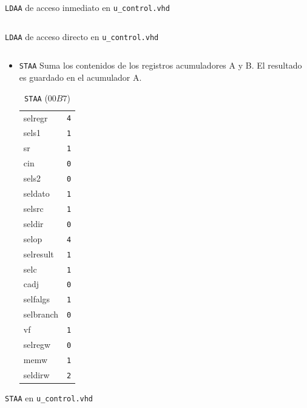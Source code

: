 \documentclass{IEEEtran}
\newenvironment{code}{\captionsetup{type=listing}}{}
\begin{document}
\begin{code}
\caption{\texttt{LDAA} de acceso inmediato en \texttt{u\_control.vhd}}
\inputminted[firstline=53, lastline=71]{vhdl}{../Risc/u_control.vhd}
\end{code}
\begin{code}
\caption{\texttt{LDAA} de acceso directo en \texttt{u\_control.vhd}}
\inputminted[firstline=93, lastline=111]{vhdl}{../Risc/u_control.vhd}
\end{code}
\begin{itemize}
\item \texttt{STAA}
Suma los contenidos de los registros acumuladores A y B. El resultado es guardado en el acumulador A.
\begin{table}[htbp]
\caption{\texttt{STAA} (\(00B7\))}
\centering
\begin{tabular}{ll}
\hline
selregr & \texttt{4}\\
sels1 & \texttt{1}\\
sr & \texttt{1}\\
cin & \texttt{0}\\
sels2 & \texttt{0}\\
seldato & \texttt{1}\\
selsrc & \texttt{1}\\
seldir & \texttt{0}\\
selop & \texttt{4}\\
selresult & \texttt{1}\\
selc & \texttt{1}\\
cadj & \texttt{0}\\
selfalgs & \texttt{1}\\
selbranch & \texttt{0}\\
vf & \texttt{1}\\
selregw & \texttt{0}\\
memw & \texttt{1}\\
seldirw & \texttt{2}\\
\hline
\end{tabular}
\end{table}
\end{itemize}
\begin{code}
\caption{\texttt{STAA} en \texttt{u\_control.vhd}}
\inputminted[firstline=133, lastline=151]{vhdl}{../Risc/u_control.vhd}
\end{code}
\end{document}
